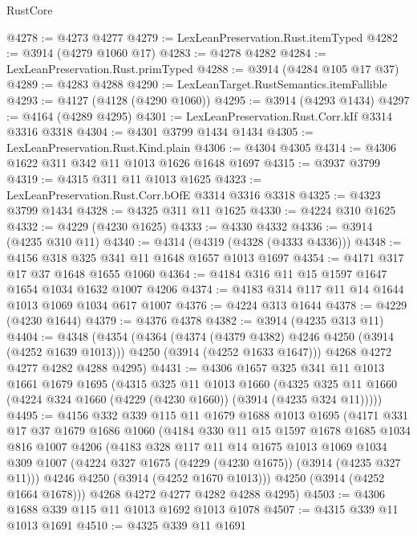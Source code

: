 \begin{lexlean}{RustCore}
\begin{coremodule}
@4278 := @4273 @4277
@4279 := LexLeanPreservation.Rust.itemTyped
@4282 := @3914 (@4279 @1060 @17)
@4283 := @4278 @4282
@4284 := LexLeanPreservation.Rust.primTyped
@4288 := @3914 (@4284 @105 @17 @37)
@4289 := @4283 @4288
@4290 := LexLeanTarget.RustSemantics.itemFallible
@4293 := @4127 (@4128 (@4290 @1060))
@4295 := @3914 (@4293 @1434)
@4297 := @4164 (@4289 @4295)
@4301 := LexLeanPreservation.Rust.Corr.kIf @3314 @3316 @3318
@4304 := @4301 @3799 @1434 @1434
@4305 := LexLeanPreservation.Rust.Kind.plain
@4306 := @4304 @4305
@4314 := @4306 @1622 @311 @342 @11 @1013 @1626 @1648 @1697
@4315 := @3937 @3799
@4319 := @4315 @311 @11 @1013 @1625
@4323 := LexLeanPreservation.Rust.Corr.bOfE @3314 @3316 @3318
@4325 := @4323 @3799 @1434
@4328 := @4325 @311 @11 @1625
@4330 := @4224 @310 @1625
@4332 := @4229 (@4230 @1625)
@4333 := @4330 @4332
@4336 := @3914 (@4235 @310 @11)
@4340 := @4314 (@4319 (@4328 (@4333 @4336)))
@4348 := @4156 @318 @325 @341 @11 @1648 @1657 @1013 @1697
@4354 := @4171 @317 @17 @37 @1648 @1655 @1060
@4364 := @4184 @316 @11 @15 @1597 @1647 @1654 @1034 @1632 @1007 @4206
@4374 := @4183 @314 @117 @11 @14 @1644 @1013 @1069 @1034 @617 @1007
@4376 := @4224 @313 @1644
@4378 := @4229 (@4230 @1644)
@4379 := @4376 @4378
@4382 := @3914 (@4235 @313 @11)
@4404 := @4348
    (@4354
      (@4364
        (@4374 (@4379 @4382) @4246 @4250 (@3914 (@4252 @1639 @1013)))
        @4250
        (@3914 (@4252 @1633 @1647)))
      @4268
      @4272
      @4277
      @4282
      @4288
      @4295)
@4431 := @4306
    @1657
    @325
    @341
    @11
    @1013
    @1661
    @1679
    @1695
    (@4315
      @325
      @11
      @1013
      @1660
      (@4325 @325 @11 @1660 (@4224 @324 @1660 (@4229 (@4230 @1660)) (@3914 (@4235 @324 @11)))))
@4495 := @4156
    @332
    @339
    @115
    @11
    @1679
    @1688
    @1013
    @1695
    (@4171
      @331
      @17
      @37
      @1679
      @1686
      @1060
      (@4184
        @330
        @11
        @15
        @1597
        @1678
        @1685
        @1034
        @816
        @1007
        @4206
        (@4183
          @328
          @117
          @11
          @14
          @1675
          @1013
          @1069
          @1034
          @309
          @1007
          (@4224 @327 @1675 (@4229 (@4230 @1675)) (@3914 (@4235 @327 @11)))
          @4246
          @4250
          (@3914 (@4252 @1670 @1013)))
        @4250
        (@3914 (@4252 @1664 @1678)))
      @4268
      @4272
      @4277
      @4282
      @4288
      @4295)
@4503 := @4306 @1688 @339 @115 @11 @1013 @1692 @1013 @1078
@4507 := @4315 @339 @11 @1013 @1691
@4510 := @4325 @339 @11 @1691

\end{coremodule}
\end{lexlean}
